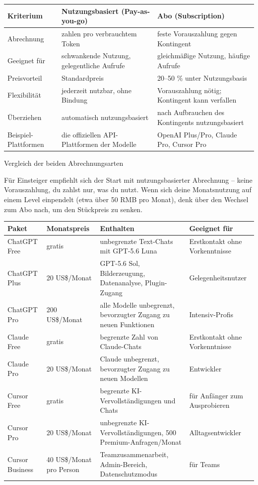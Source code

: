 
\begin{center}
\begin{tabularx}{\linewidth}{|X|X|X|}
\hline
\textbf{Kriterium} & \textbf{Nutzungsbasiert (Pay-as-you-go)} & \textbf{Abo (Subscription)} \tabularnewline
\hline
Abrechnung & zahlen pro verbrauchtem Token & feste Vorauszahlung gegen Kontingent \tabularnewline
Geeignet für & schwankende Nutzung, gelegentliche Aufrufe & gleichmäßige Nutzung, häufige Aufrufe \tabularnewline
Preisvorteil & Standardpreis & 20–50 \% unter Nutzungsbasis \tabularnewline
Flexibilität & jederzeit nutzbar, ohne Bindung & Vorauszahlung nötig; Kontingent kann verfallen \tabularnewline
Überziehen & automatisch nutzungsbasiert & nach Aufbrauchen des Kontingents nutzungsbasiert \tabularnewline
Beispiel-Plattformen & die offiziellen API-Plattformen der Modelle & OpenAI Plus/Pro, Claude Pro, Cursor Pro \tabularnewline
\hline
\end{tabularx}
\end{center}

\begin{center}\small\color{gray}Vergleich der beiden Abrechnungsarten\end{center}

Für Einsteiger empfiehlt sich der Start mit nutzungsbasierter Abrechnung – keine Vorauszahlung, du zahlst nur, was du nutzt. Wenn sich deine Monatsnutzung auf einem Level einpendelt (etwa über 50 RMB pro Monat), denk über den Wechsel zum Abo nach, um den Stückpreis zu senken.


\begin{center}
\begin{tabularx}{\linewidth}{|X|X|X|X|}
\hline
\textbf{Paket} & \textbf{Monatspreis} & \textbf{Enthalten} & \textbf{Geeignet für} \tabularnewline
\hline
ChatGPT Free & gratis & unbegrenzte Text-Chats mit GPT-5.6 Luna & Erstkontakt ohne Vorkenntnisse \tabularnewline
ChatGPT Plus & 20 US\$/Monat & GPT-5.6 Sol, Bilderzeugung, Datenanalyse, Plugin-Zugang & Gelegenheitsnutzer \tabularnewline
ChatGPT Pro & 200 US\$/Monat & alle Modelle unbegrenzt, bevorzugter Zugang zu neuen Funktionen & Intensiv-Profis \tabularnewline
Claude Free & gratis & begrenzte Zahl von Claude-Chats & Erstkontakt ohne Vorkenntnisse \tabularnewline
Claude Pro & 20 US\$/Monat & Claude unbegrenzt, bevorzugter Zugang zu neuen Modellen & Entwickler \tabularnewline
Cursor Free & gratis & begrenzte KI-Vervollständigungen und Chats & für Anfänger zum Ausprobieren \tabularnewline
Cursor Pro & 20 US\$/Monat & unbegrenzte KI-Vervollständigungen, 500 Premium-Anfragen/Monat & Alltagsentwickler \tabularnewline
Cursor Business & 40 US\$/Monat pro Person & Teamzusammenarbeit, Admin-Bereich, Datenschutzmodus & für Teams \tabularnewline
\hline
\end{tabularx}
\end{center}

